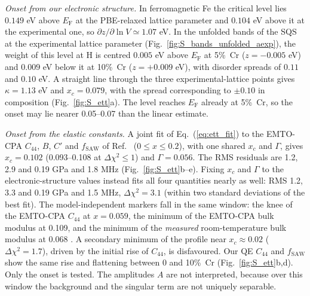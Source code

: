 \documentclass[final,3p,times]{elsarticle}
\begin{document}
\textit{Onset from our electronic structure.} In ferromagnetic Fe the critical level lies $0.149$ eV above $E_{\mathrm F}$ at the PBE-relaxed lattice parameter and $0.104$ eV above it at the experimental one, so $\partial z/\partial\ln V\simeq1.07$ eV. In the unfolded bands of the SQS at the experimental lattice parameter (Fig.~\ref{fig:S_bands_unfolded_aexp}), the weight of this level at H is centred $0.005$ eV above $E_{\mathrm F}$ at 5\%~Cr ($z=-0.005$ eV) and $0.009$ eV below it at 10\%~Cr ($z=+0.009$ eV), with disorder spreads of $0.11$ and $0.10$ eV. A straight line through the three experimental-lattice points gives $\kappa=1.13$ eV and $x_c=0.079$, with the spread corresponding to $\pm0.10$ in composition (Fig.~\ref{fig:S_ett}a). The level reaches $E_{\mathrm F}$ already at 5\%~Cr, so the onset may lie nearer 0.05--0.07 than the linear estimate.

\textit{Onset from the elastic constants.} A joint fit of Eq.~(\ref{eq:ett_fit}) to the EMTO-CPA $C_{44}$, $B$, $C'$ and $f_{\mathrm{SAW}}$ of Ref.~\cite{razumovskiy2011first} ($0\le x\le0.2$), with one shared $x_c$ and $\Gamma$, gives $x_c=0.102$ (0.093--0.108 at $\Delta\chi^2\le1$) and $\Gamma=0.056$. The RMS residuals are 1.2, 2.9 and 0.19 GPa and 1.8 MHz (Fig.~\ref{fig:S_ett}b--e). Fixing $x_c$ and $\Gamma$ to the electronic-structure values instead fits all four quantities nearly as well: RMS 1.2, 3.3 and 0.19 GPa and 1.5 MHz, $\Delta\chi^2=3.1$ (within two standard deviations of the best fit). The model-independent markers fall in the same window: the knee of the EMTO-CPA $C_{44}$ at $x=0.059$, the minimum of the EMTO-CPA bulk modulus at 0.109, and the minimum of the \emph{measured} room-temperature bulk modulus at 0.068 \cite{korzhavyi2009electronic}. A secondary minimum of the profile near $x_c\approx0.02$ ($\Delta\chi^2=1.7$), driven by the initial rise of $C_{44}$, is disfavoured. Our QE $C_{44}$ and $f_{\mathrm{SAW}}$ show the same rise and flattening between 0 and 10\%~Cr (Fig.~\ref{fig:S_ett}b,d). Only the onset is tested. The amplitudes $A$ are not interpreted, because over this window the background and the singular term are not uniquely separable.
\end{document}
